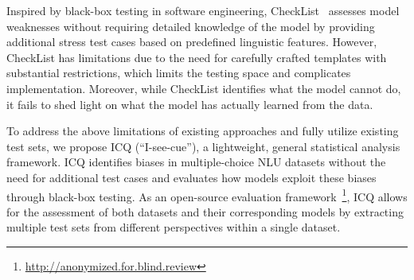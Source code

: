 Inspired by black-box testing in software engineering, 
CheckList~\cite{checklist2020acl} 
assesses model weaknesses without requiring detailed knowledge 
of the model by providing additional stress test cases based 
on predefined linguistic features. 
However, CheckList has limitations due to 
the need for carefully crafted templates with 
substantial restrictions, which limits the 
testing space and complicates implementation. 
Moreover, while CheckList identifies what the model cannot do, 
it fails to shed light on what the model has actually learned from the data.

%


To address the above limitations of existing approaches and 
fully utilize existing test sets, we propose ICQ (``I-see-cue''), 
a lightweight, general statistical analysis framework. 
ICQ identifies biases in multiple-choice NLU datasets 
without the need for additional test cases and evaluates 
how models exploit these biases through black-box testing. 
As an open-source evaluation framework~\footnote{\url{http://anonymized.for.blind.review}}, 
ICQ allows for the assessment of both datasets and their 
corresponding models by extracting multiple test sets 
from different perspectives within a single dataset.

